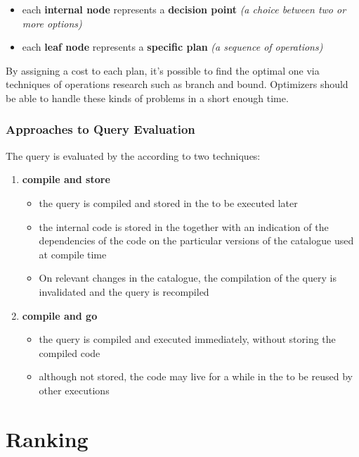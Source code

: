 \documentclass[english]{article}
\begin{document}
\begin{itemize}
  \item each \textbf{internal node} represents a \textbf{decision point} \textit{(a choice between two or more options)}
  \item each \textbf{leaf node} represents a \textbf{specific plan} \textit{(a sequence of operations)}
\end{itemize}

By assigning a cost to each plan, it's possible to find the optimal one via techniques of operations research such as branch and bound.
Optimizers should be able to handle these kinds of problems in a short enough time.

\subsubsection{Approaches to Query Evaluation}

The query is evaluated by the \dbms according to two techniques:

\begin{enumerate}
  \item \textbf{compile and store}
        \begin{itemize}
          \item the query is compiled and stored in the \dbms to be executed later
          \item the internal code is stored in the \dbms together with an indication of the dependencies of the code on the particular versions of the catalogue used at compile time
          \item On relevant changes in the catalogue, the compilation of the query is invalidated and the query is recompiled
        \end{itemize}
  \item \textbf{compile and go}
        \begin{itemize}
          \item the query is compiled and executed immediately, without storing the compiled code
          \item although not stored, the code may live for a while in the \dbms to be reused by other executions
        \end{itemize}
\end{enumerate}

\clearpage

\section{Ranking}
\end{document}
